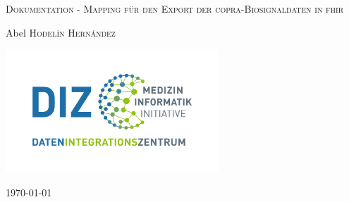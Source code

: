 \begin{titlepage}
	\thispagestyle{firstpage}
	
	\centering
	{\scshape\LARGE Dokumentation - Mapping für den Export der \acs{copra}-Biosignaldaten in \acs{fhir} \par} 
	\vspace{1.5cm}
		\vspace{2cm}
	{\Large Abel \textsc{Hodelín Hernández}\par} 
	\vspace{2cm}
	\includegraphics[width=8cm]{figures/diz}
	\vfill
	{\large \today\par}
	
\end{titlepage}